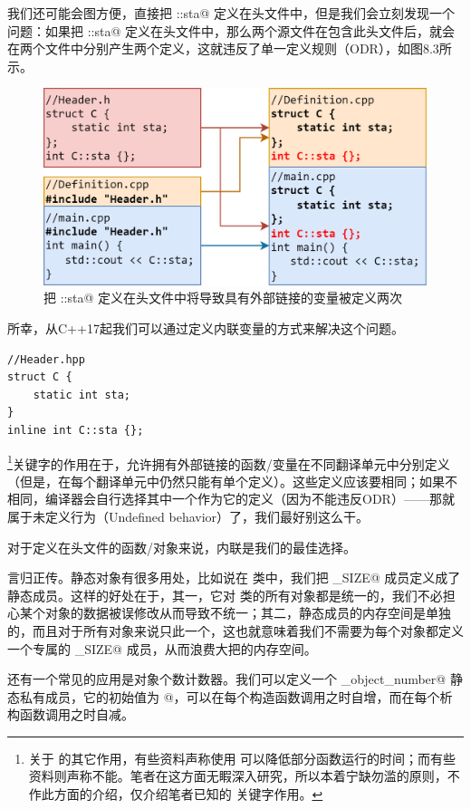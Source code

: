 我们还可能会图方便，直接把 \lstinline@C::sta@ 定义在头文件中，但是我们会立刻发现一个问题：如果把 \lstinline@C::sta@ 定义在头文件中，那么两个源文件在包含此头文件后，就会在两个文件中分别产生两个定义，这就违反了单一定义规则（ODR），如图8.3所示。\par
\begin{figure}[htbp]
    \centering
    \includegraphics[width=.8\textwidth]{../images/generalized_parts/08_file_inclusion.png}
    \caption{把 \lstinline@C::sta@ 定义在头文件中将导致具有外部链接的变量被定义两次}
\end{figure}
所幸，从C++17起我们可以通过定义内联变量的方式来解决这个问题。
\begin{lstlisting}
//Header.hpp
struct C {
    static int sta;
}
inline int C::sta {};
\end{lstlisting}
\lstinline@inline@\footnote{关于 \lstinline@inline@ 的其它作用，有些资料声称使用 \lstinline@inline@ 可以降低部分函数运行的时间；而有些资料则声称不能。笔者在这方面无睱深入研究，所以本着宁缺勿滥的原则，不作此方面的介绍，仅介绍笔者已知的 \lstinline@inline@ 关键字作用。}关键字的作用在于，允许拥有外部链接的函数/变量在不同翻译单元中分别定义（但是，在每个翻译单元中仍然只能有单个定义）。这些定义应该要相同；如果不相同，编译器会自行选择其中一个作为它的定义（因为不能违反ODR）——那就属于未定义行为（Undefined behavior）了，我们最好别这么干。\par
对于定义在头文件的函数/对象来说，内联是我们的最佳选择。\par
言归正传。静态对象有很多用处，比如说在 \lstinline@valarray@ 类中，我们把 \lstinline@MAX_SIZE@ 成员定义成了静态成员。这样的好处在于，其一，它对 \lstinline@valarri@ 类的所有对象都是统一的，我们不必担心某个对象的数据被误修改从而导致不统一；其二，静态成员的内存空间是单独的，而且对于所有对象来说只此一个，这也就意味着我们不需要为每个对象都定义一个专属的 \lstinline@MAX_SIZE@ 成员，从而浪费大把的内存空间。\par
还有一个常见的应用是对象个数计数器。我们可以定义一个 \lstinline@_object_number@ 静态私有成员，它的初始值为 @，可以在每个构造函数调用之时自增，而在每个析构函数调用之时自减。
